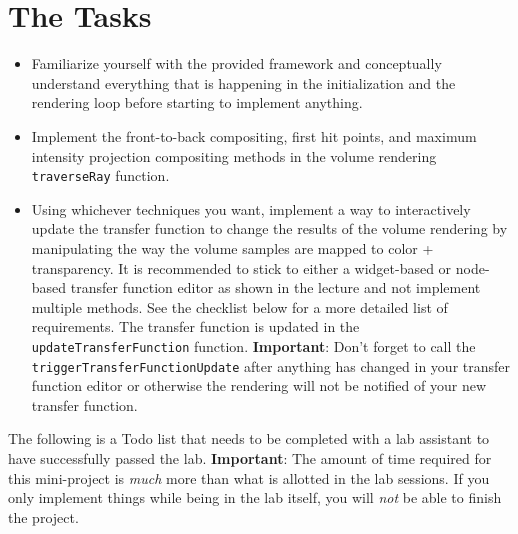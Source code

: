 \documentclass{labinstructions}
\begin{document}
\section{The Tasks}
\begin{itemize}
  \item Familiarize yourself with the provided framework and conceptually understand everything that is happening in the initialization and the rendering loop before starting to implement anything.
  \item Implement the front-to-back compositing, first hit points, and maximum intensity projection compositing methods in the volume rendering \texttt{traverseRay} function.
  \item Using whichever techniques you want, implement a way to interactively update the transfer function to change the results of the volume rendering by manipulating the way the volume samples are mapped to color + transparency.  It is recommended to stick to either a widget-based or node-based transfer function editor as shown in the lecture and not implement multiple methods.  See the checklist below for a more detailed list of requirements.  The transfer function is updated in the \texttt{updateTransferFunction} function.  \textbf{Important}:  Don't forget to call the \texttt{triggerTransferFunctionUpdate} after anything has changed in your transfer function editor or otherwise the rendering will not be notified of your new transfer function.
\end{itemize}

The following is a Todo list that needs to be completed with a lab assistant to have successfully passed the lab.  \textbf{Important}:  The amount of time required for this mini-project is \emph{much} more than what is allotted in the lab sessions.  If you only implement things while being in the lab itself, you will \emph{not} be able to finish the project.
\end{document}
